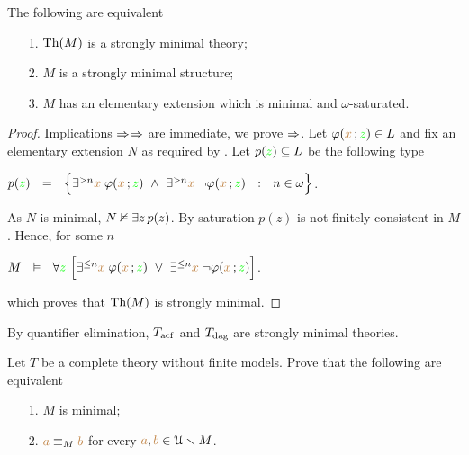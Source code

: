 \begin{proposition}\label{prop_fmequivalenzadefinizioni}
The following are equivalent
\begin{itemize}
\item[1.] $\textrm{Th}(M)$ is a strongly minimal theory;
\item[2.] $M$ is a strongly minimal structure; 
\item[3.] $M$ has an elementary extension which is minimal and $\omega$-saturated.
\end{itemize}
\end{proposition}
\begin{proof}
Implications $\Rightarrow$$\Rightarrow$ are immediate, we prove $\Rightarrow$.  Let $\varphi({\color{brown} x}\,;{\color{green} z})\in L$ and fix an elementary extension $N$ as required by . Let $p({\color{green} z})\subseteq L$ be the following type

\hfil$p({\color{green} z})\ \ =\ \ \Big\{ \exists^{> n}{\color{brown} x}\;\varphi({\color{brown} x}\,;{\color{green} z})\ \wedge\ \exists^{> n}{\color{brown} x}\;\neg\varphi({\color{brown} x}\,;{\color{green} z}) \ \ :\ \ n\in\omega\Big\}$.

As $N$ is minimal, $N\nvDash \exists z\,p(z)$. By saturation $p(z)$ is not finitely consistent in $M$. Hence, for some $n$ 

\hfil$M\ \ \vDash\ \  \forall {\color{green}z}\ \Big[\exists^{\le n}{\color{brown} x}\;\varphi({\color{brown} x}\,;{\color{green} z})\ \vee\ \exists^{\le n}{\color{brown} x}\;\neg\varphi({\color{brown} x}\,;{\color{green} z})\Big]$.

which proves that $\textrm{Th}(M)$ is strongly minimal.
\end{proof}

By quantifier elimination, $T_{\rm acf}$ and $T_{\rm dag}$ are strongly minimal theories.

\begin{exercise}
Let $T$ be a complete theory without finite models. Prove that the following are equivalent
\begin{itemize}
\item[1.] $M$ is minimal;
\item[2.] ${\color{brown} a}\equiv_M{\color{brown} b}$ for every ${\color{brown} a}, {\color{brown} b}\in \EuScript U\smallsetminus M$.\QED
\end{itemize}
\end{exercise}















